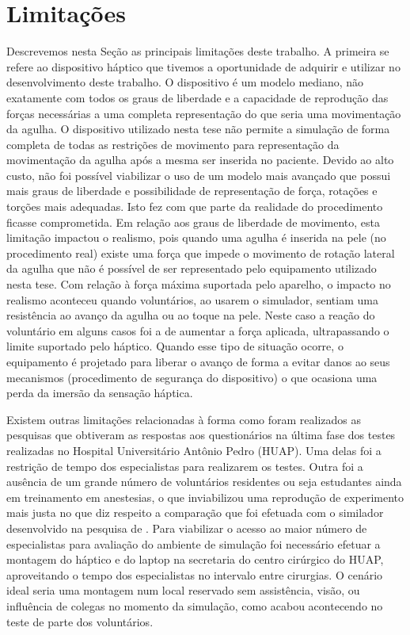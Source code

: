 \section{Limitações}

Descrevemos nesta Seção as principais limitações deste trabalho. A primeira se refere ao dispositivo háptico que tivemos a oportunidade de adquirir e utilizar no desenvolvimento deste trabalho. O dispositivo é um modelo mediano, não exatamente com todos os graus de liberdade e a capacidade de reprodução das forças necessárias a uma completa representação do que seria uma movimentação da agulha. O dispositivo utilizado nesta tese não permite a simulação de forma completa de todas as restrições de movimento para representação da movimentação da agulha após a mesma ser inserida no paciente. Devido ao alto custo, não foi possível viabilizar o uso de um modelo mais avançado que possui mais graus de liberdade e possibilidade de representação de força, rotações e torções mais adequadas. Isto fez com que parte da realidade do procedimento ficasse comprometida. Em relação aos graus de liberdade de movimento, esta limitação impactou o realismo, pois quando uma agulha é inserida na pele (no procedimento real) existe uma força que impede o movimento de rotação lateral da agulha que não é possível de ser representado pelo equipamento utilizado nesta tese. Com relação à força máxima suportada pelo aparelho, o impacto no realismo aconteceu quando voluntários, ao usarem o simulador, sentiam uma resistência ao avanço da agulha ou ao toque na pele. Neste caso a reação do voluntário em alguns casos foi a de aumentar a força aplicada, ultrapassando o limite suportado pelo háptico. Quando esse tipo de situação ocorre, o equipamento é projetado para liberar o avanço de forma a evitar danos ao seus mecanismos (procedimento de segurança do dispositivo) o que ocasiona uma perda da imersão da sensação háptica.

Existem outras limitações relacionadas à forma como foram realizados as pesquisas que obtiveram as respostas aos questionários na última fase dos testes realizadas no Hospital Universitário Antônio Pedro (HUAP). Uma delas foi a restrição de tempo dos especialistas para realizarem os testes. Outra foi a ausência de um grande número de voluntários residentes ou seja estudantes ainda em treinamento em anestesias, o que inviabilizou uma reprodução de experimento mais justa no que diz respeito a comparação que foi efetuada com o similador desenvolvido na pesquisa de \textcite{Farber2008}. Para viabilizar o acesso ao maior número de especialistas para avaliação do ambiente de simulação foi necessário efetuar a montagem do háptico e do laptop na secretaria do centro cirúrgico do HUAP, aproveitando o tempo dos especialistas no intervalo entre cirurgias. O cenário ideal seria uma montagem num local reservado sem assistência, visão, ou influência de colegas no momento da simulação, como acabou acontecendo no teste de parte dos voluntários. 

